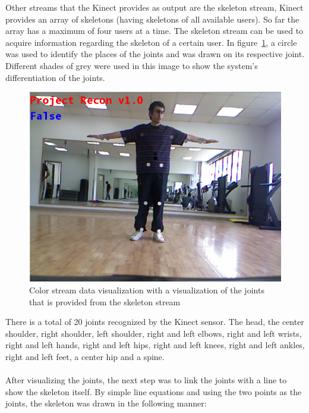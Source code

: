 Other streams that the Kinect provides as output are the skeleton stream, Kinect provides an array of skeletons (having skeletons of all available users). So far the array has a maximum of four users at a time. The skeleton stream can be used to acquire information regarding the skeleton of a certain user. In figure~\ref{colorjoints}, a circle was used to identify the places of the joints and was drawn on its respective joint. Different shades of grey were used in this image to show the system's differentiation of the joints.

\begin{figure}[!htbp]
\centering
\includegraphics[width=1\textwidth]{images/color_joints.png}
\caption{Color stream data visualization with a visualization of the joints that is provided from the skeleton stream}
\label{colorjoints}
\end{figure}

There is a total of 20 joints recognized by the Kinect sensor. The head, the center shoulder, right shoulder, left shoulder, right and left elbows, right and left wrists, right and left hands, right and left hips, right and left knees, right and left ankles, right and left feet, a center hip and a spine.
\\
\\
After visualizing the joints, the next step was to link the joints with a line to show the skeleton itself. By simple line equations and using the two points as the joints, the skeleton was drawn in the following manner:

